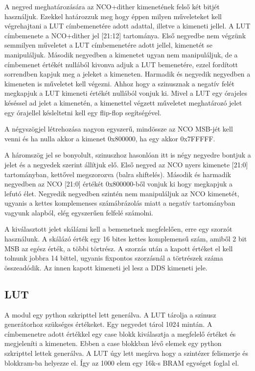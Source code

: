 \documentclass[a4paper,11pt]{article}
\begin{document}
A negyed meghatározására az NCO+dither kimenetének felső két bitjét használjuk. Ezekkel határozzuk meg hogy éppen milyen műveleteket kell végrehajtani a LUT címbemenetére adott adattal, illetve a kimeneti jellel. A LUT címbemenete a NCO+dither jel [21:12] tartománya. Első negyedbe nem végzünk semmilyen műveletet a LUT címbemenetére adott jellel, kimenetét se manipuláljuk. Második negyedben a kimenetet ugyan nem manipuláljuk, de a címbemenet értékét nullából kivonva adjuk a LUT bemenetére, ezzel fordított sorrendben kapjuk meg a jeleket a kimeneten. Harmadik és negyedik negyedben a kimeneten is műveletet kell végezni. Ahhoz hogy a szinusznak a negatív felét megkapjuk a LUT kimeneti értékét nullából vonjuk ki. Mivel a LUT egy órajeles késéssel ad jelet a kimenetén, a kimenettel végzett műveletet meghatározó jelet egy órajellel késleltetni kell egy flip-flop segítségével.

A négyszögjel létrehozása nagyon egyszerű, mindössze az NCO MSB-jét kell venni és ha nulla akkor a kimenet 0x800000, ha egy akkor 0x7FFFFF.

A háromszög jel se bonyolult, szinuszhoz hasonlóan itt is négy negyedre bontjuk a jelet és a negyedek szerint állítjuk elő. Első negyed az NCO nyers kimenete [21:0] tartományban, kettővel megszorozva (balra shiftelés). Második és harmadik negyedben az NCO [21:0] értékét 0x800000-ből vonjuk ki hogy megkapjuk a lefutó élet. Negyedik negyedben szintén nem manipuláljuk az NCO kimenetét, ugyanis a kettes komplemenses számábrázolás miatt a negatív tartományban vagyunk alapból, elég egyszerűen felfelé számolni.

A kiválasztott jelet skálázni kell a bemenetnek megfelelően, erre egy szorzót használunk. A skálázó érték egy 16 bites kettes komplemensű szám, amiből 2 bit MSB az egész érték, a többi törtrész. A szorzás után a kapott értéket el kell tolnunk jobbra 14 bittel, ugyanis fixpontos szorzásnál a törtrészek száma összeadódik. Az innen kapott kimeneti jel lesz a DDS kimeneti jele.

\subsection{LUT}

A modul egy python szkripttel lett generálva.
A LUT tárolja a szinusz generátorhoz szükséges értékeket. Egy negyedet tárol 1024 mintán. A címbemenetre adott értékkel egy case blokk kiválasztja a megfelelő értéket és megjeleníti a kimeneten. Ebben a case blokkban lévő elemek egy python szkripttel lettek generálva. A LUT úgy lett megírva hogy a szintézer felismerje és blokkram-ba helyezze el. Így az 1000 elem egy 16k-s BRAM egységet foglal el.
\end{document}
